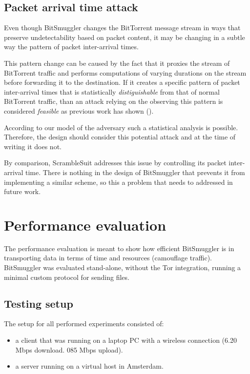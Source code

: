 \documentclass[11pt]{book} %
\newcommand{\projectName}{BitSmuggler }
\begin{document}
\subsection{Packet arrival time attack}

Even though \projectName changes the BitTorrent message stream in ways that preserve undetectability based on packet content, it may be changing in a subtle way the pattern of packet inter-arrival times.

This pattern change can be caused by the fact that it proxies the stream of BitTorrent traffic and performs computations of varying durations on the stream before forwarding it to the destination. If it creates a specific pattern of packet inter-arrival times that is statistically  \textit{distiguishable} from that of normal BitTorrent traffic, than an attack relying on the observing this pattern is considered \textit{feasible} as previous work has shown (\citep*{interPacket}).

According to our model of the adversary such a statistical analysis is possible. Therefore, the design should consider this potential attack and at the time of writing it does not.

By comparison, ScrambleSuit \citep*{scrambleSuit} addresses this issue by controlling its packet inter-arrival time. There is nothing in the design of \projectName that prevents it from implementing a similar scheme, so this a problem that needs to addressed in future work.


\section{Performance evaluation}
\label{perfEval}

The performance evaluation is meant to show how efficient \projectName is in transporting data in terms of time and resources (camouflage traffic). \projectName was evaluated stand-alone, without the Tor integration, running a minimal custom protocol for sending files.

\subsection{Testing setup}

The setup for all performed experiments consisted of:
\begin{itemize}
\item a client that was running on a laptop PC with a wireless connection (6.20 Mbps download. 085 Mbps upload).
\item a server running on a virtual host in Amsterdam.
\end{itemize}
\end{document}

